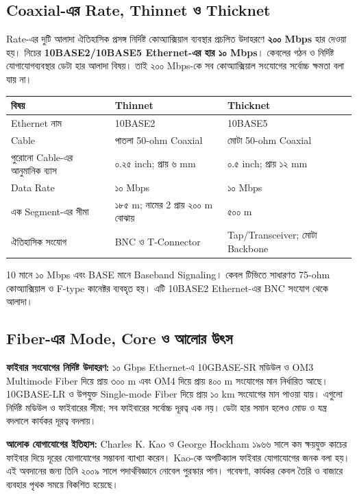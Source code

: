 \subsection{Coaxial-এর Rate, Thinnet ও Thicknet}
\begin{keypointbox}{Rate-এর দুটি আলাদা ঐতিহাসিক প্রসঙ্গ}
নির্দিষ্ট কোঅ্যাক্সিয়াল ব্যবস্থার প্রচলিত উদাহরণে \textbf{২০০ Mbps} হার দেওয়া হয়। নিচের \textbf{10BASE2/10BASE5 Ethernet-এর হার ১০ Mbps}। কেবলের গঠন ও নির্দিষ্ট যোগাযোগব্যবস্থার ডেটা হার আলাদা বিষয়। তাই ২০০ Mbps-কে সব কোঅ্যাক্সিয়াল সংযোগের সর্বোচ্চ ক্ষমতা বলা যায় না।
\end{keypointbox}
\begin{tabularx}{\linewidth}{|p{.22\linewidth}|X|X|}
\hline
\textbf{বিষয়} & \textbf{Thinnet} & \textbf{Thicknet}\\\hline
Ethernet নাম & 10BASE2 & 10BASE5\\\hline
Cable & পাতলা 50-ohm Coaxial & মোটা 50-ohm Coaxial\\\hline
পুরোনো Cable-এর আনুমানিক ব্যাস & ০.২৫ inch; প্রায় ৬ mm & ০.৫ inch; প্রায় ১২ mm\\\hline
Data Rate & ১০ Mbps & ১০ Mbps\\\hline
এক Segment-এর সীমা & ১৮৫ m; নামের 2 প্রায় ২০০ m বোঝায় & ৫০০ m\\\hline
ঐতিহাসিক সংযোগ & BNC ও T-Connector & Tap/Transceiver; মোটা Backbone\\\hline
\end{tabularx}
10 মানে ১০ Mbps এবং BASE মানে Baseband Signaling। কেবল টিভিতে সাধারণত 75-ohm কোঅ্যাক্সিয়াল ও F-type কানেক্টর ব্যবহৃত হয়। এটি 10BASE2 Ethernet-এর BNC সংযোগ থেকে আলাদা।

\subsection{Fiber-এর Mode, Core ও আলোর উৎস}
\textbf{ফাইবার সংযোগের নির্দিষ্ট উদাহরণ:} ১০ Gbps Ethernet-এ 10GBASE-SR মডিউল ও OM3 Multimode Fiber দিয়ে প্রায় ৩০০ m এবং OM4 দিয়ে প্রায় ৪০০ m সংযোগের মান নির্ধারিত আছে। 10GBASE-LR ও উপযুক্ত Single-mode Fiber দিয়ে প্রায় ১০ km সংযোগের মান পাওয়া যায়। এগুলো নির্দিষ্ট মডিউল ও ফাইবারের সীমা; সব ফাইবারের সর্বোচ্চ দূরত্ব এক নয়। ডেটা হার সমান হলেও মোড ও যন্ত্র বদলালে কার্যকর দূরত্ব বদলায়।

\textbf{আলোক যোগাযোগের ইতিহাস:} Charles K. Kao ও George Hockham ১৯৬৬ সালে কম ক্ষয়যুক্ত কাচের ফাইবার দিয়ে দূরের যোগাযোগের সম্ভাবনা ব্যাখ্যা করেন। Kao-কে অপটিক্যাল ফাইবার যোগাযোগের জনক বলা হয়। এই অবদানের জন্য তিনি ২০০৯ সালে পদার্থবিজ্ঞানে নোবেল পুরস্কার পান। গবেষণা, কার্যকর কেবল তৈরি ও বাজারে ব্যবহার পৃথক সময়ে বিকশিত হয়েছে।

